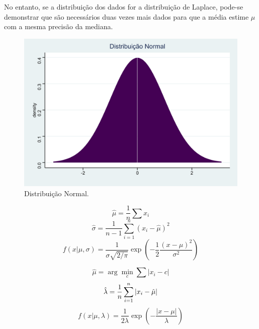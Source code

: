 \documentclass[a4paper, 12pt]{article}
\begin{document}
No entanto, se a distribuição dos dados for a distribuição de Laplace,
pode-se demonstrar que são necessários duas vezes mais dados para que a
média estime \(\mu\) com a mesma precisão da mediana.

\hspace{-1.6cm}\begin{minipage}{0.5\textwidth}
\begin{figure}[H]

{\centering \includegraphics[width=0.7\linewidth]{images/dist_normal-1} 

}

\caption{Distribuição Normal.}\label{fig:dist_normal}
\end{figure}

\end{minipage}
\begin{minipage}{0.5\textwidth}

$$\hat \mu = \frac{1}{n}\sum x_i$$
$$\hat \sigma = \frac{1}{n-1} \sum_{i=1}^n (x_i - \hat \mu)^2$$
$$f(x|\mu, \sigma) = \frac{1}{\sigma\sqrt{2/\pi}}\exp \left (-\frac{1}{2}\frac{(x - \mu)^2}{\sigma^2} \right )$$
\end{minipage}
\hspace{-1.6cm}\begin{minipage}{0.5\textwidth}
$$\hat \mu = \arg\min_c \sum |x_i - c|$$
$$\hat \lambda = \frac{1}{n} \sum_{i=1}^n |x_i - \hat \mu| \\$$
$$f(x|\mu, \lambda) = \frac{1}{2 \lambda} \exp \left ( -\frac{|x - \mu|}{\lambda}\right )$$
\end{minipage}
\end{document}

